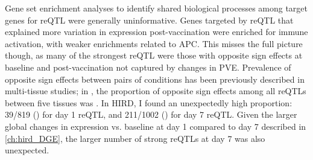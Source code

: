 Gene set enrichment analyses to identify shared biological processes among target genes for \gls{reQTL} were generally uninformative.
Genes targeted by \gls{reQTL} that explained more variation in expression post-vaccination were enriched for immune activation, with weaker enrichments related to \gls{APC}.
This misses the full picture though, as many of the strongest \gls{reQTL} were those with opposite sign effects at baseline and post-vaccination not captured by changes in \gls{PVE}.
Prevalence of opposite sign effects between pairs of conditions has been previously described in multi-tissue studies;
in \textcite{fu2012UnravelingRegulatoryMechanisms}, the proportion of opposite sign effects among all reQTLs between five tissues was .
In \gls{HIRD}, I found an unexpectedly high proportion:
39/819 () for day 1 \gls{reQTL},
and 211/1002 () for day 7 \gls{reQTL}.
Given the larger global changes in expression vs. baseline at day 1 compared to
day 7 described in \cref{ch:hird_DGE}, 
the larger number of strong \glspl{reQTL} at day 7 was also unexpected.

